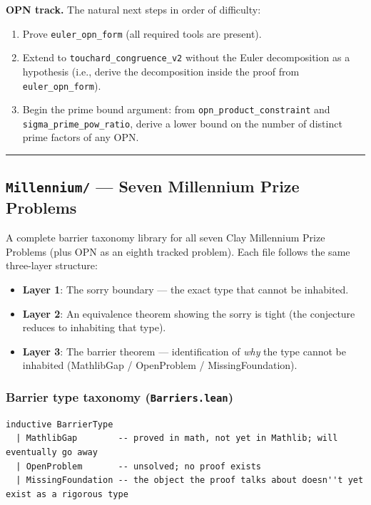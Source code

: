 \documentclass[11pt,a4paper]{article}
\begin{document}
\textbf{OPN track.} The natural next steps in order of difficulty:

\begin{enumerate}
    \item Prove \texttt{euler\_opn\_form} (all required tools are present).
    \item Extend to \texttt{touchard\_congruence\_v2} without the Euler decomposition as a hypothesis
(i.e., derive the decomposition inside the proof from \texttt{euler\_opn\_form}).
    \item Begin the prime bound argument: from \texttt{opn\_product\_constraint} and \texttt{sigma\_prime\_pow\_ratio},
derive a lower bound on the number of distinct prime factors of any OPN.
\end{enumerate}

\begin{center}
\rule{0.5\textwidth}{0.4pt}
\end{center}

\subsection{\texttt{Millennium/} --- Seven Millennium Prize Problems}

A complete barrier taxonomy library for all seven Clay Millennium Prize Problems (plus OPN as an eighth tracked problem). Each file follows the same three-layer structure:

\begin{itemize}
    \item \textbf{Layer 1}: The sorry boundary --- the exact type that cannot be inhabited.
    \item \textbf{Layer 2}: An equivalence theorem showing the sorry is tight (the conjecture reduces to inhabiting that type).
    \item \textbf{Layer 3}: The barrier theorem --- identification of \emph{why} the type cannot be inhabited (MathlibGap / OpenProblem / MissingFoundation).
\end{itemize}

\subsubsection{Barrier type taxonomy (\texttt{Barriers.lean})}

\begin{lstlisting}[language=lean]
inductive BarrierType
  | MathlibGap        -- proved in math, not yet in Mathlib; will eventually go away
  | OpenProblem       -- unsolved; no proof exists
  | MissingFoundation -- the object the proof talks about doesn''t yet exist as a rigorous type
\end{lstlisting}
\end{document}
